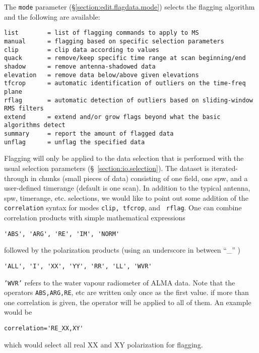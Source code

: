 The {\tt mode} parameter (\S \ref{section:edit.flagdata.mode}) selects the flagging algorithm and the following are available:

\small
\begin{verbatim}
list        = list of flagging commands to apply to MS
manual      = flagging based on specific selection parameters
clip        = clip data according to values
quack       = remove/keep specific time range at scan beginning/end
shadow      = remove antenna-shadowed data
elevation   = remove data below/above given elevations
tfcrop      = automatic identification of outliers on the time-freq plane
rflag       = automatic detection of outliers based on sliding-window RMS filters
extend      = extend and/or grow flags beyond what the basic algorithms detect
summary     = report the amount of flagged data
unflag      = unflag the specified data
\end{verbatim}
\normalsize

Flagging will only be applied to the data selection that is performed
with the usual selection parameters (\S~\ref{section:io.selection}).
The dataset is iterated-through in chunks (small pieces of data)
consisting of one field, one spw, and a user-defined timerange
(default is one scan). In addition to the typical antenna, spw,
timerange, etc. selections, we would like to point out some addition
of the {\tt correlation} syntax for modes {\tt clip, tfcrop}, and {\tt
  rflag}. One can combine correlation products with simple
mathematical expressions  

\small
\begin{verbatim}
'ABS', 'ARG', 'RE', 'IM', 'NORM' 
\end{verbatim}
\normalsize
followed by the polarization products (using an underscore in between ``\_'' )

\small
\begin{verbatim}
'ALL', 'I', 'XX', 'YY', 'RR', 'LL', 'WVR' 
\end{verbatim}
\normalsize

{\tt 'WVR'} refers to the water vapour radiometer of ALMA data. Note that
the operators {\tt ABS,ARG,RE}, etc are written only once as the first
value.  if more than one correlation is given, the operator will be
applied to all of them. An example would be 

\small
\begin{verbatim}
correlation='RE_XX,XY'
\end{verbatim}
\normalsize

which would select all real XX and XY polarization for flagging. 

